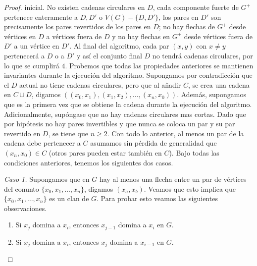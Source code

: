 \begin{proof}
  inicial. No existen cadenas circulares en $D$, cada componente fuerte de $G^+$
  pertenece enteramente a $D, D'$ o $V(G)-\{D,D' \}$, los pares en $D'$ son
  precisamente los pares revertidos de los pares en $D$; no hay flechas de $G^+$
  desde v\'ertices en $D$ a v\'ertices fuera de $D$ y no hay flechas en $G^+$
  desde v\'ertices fuera de $D'$ a un v\'ertice en $D'$. Al final del algoritmo,
  cada par $(x,y)$ con $x\neq y$ pertenecer\'a a $D$ o a $D'$ y así el conjunto
  final $D$ no tendr\'a cadenas circulares, por lo que se cumplir\'a $4$.
  Probemos que todas las propiedades anteriores se mantienen invariantes durante
  la ejecuci\'on del algoritmo. Supongamos por contradicci\'on que el $D$ actual
  no tiene cadenas circulares, pero que al añadir $C$, se crea una cadena en
  $C\cup D$, digamos $((x_0,x_1),(x_1,x_2),\dots, (x_n,x_0))$. Adem\'as,
  supongamos que es la primera vez que se obtiene la cadena durante la
  ejecuci\'on del algoritmo. Adicionalmente, sup\'ongase que no hay cadenas
  circulares mas cortas. Dado que por hip\'otesis no hay pares invertibles y que
  nunca se coloca un par y su par revertido en $D$, se tiene que $n\geq 2$. Con
  todo lo anterior, al menos un par de la cadena debe pertenecer a $C$ asumamos
  sin p\'erdida de generalidad que $(x_n,x_0)\in C$ (otros pares pueden estar
  tambi\'en en $C$). Bajo todas las condiciones anteriores, tenemos los
  siguientes dos casos.

  \textit{Caso 1.} Supongamos que en $G$ hay al menos una flecha entre un par de
  v\'ertices del conunto $\{ x_0,x_1,\dots,x_n \}$, digamos $(x_a,x_b)$. Veamos
  que esto implica que $\{ x_0,x_1,\dots,x_n \}$ es un clan de $G$. Para probar
  esto veamos las siguientes observaciones.
  \begin{enumerate}
    \item Si $x_j$ domina a $x_i$, entonces $x_{j-1}$ domina a $x_i$ en $G$.
    \item Si $x_j$ domina a $x_i$, entonces $x_j$ domina a $x_{i-1}$ en $G$.
  \end{enumerate}



\end{proof}
